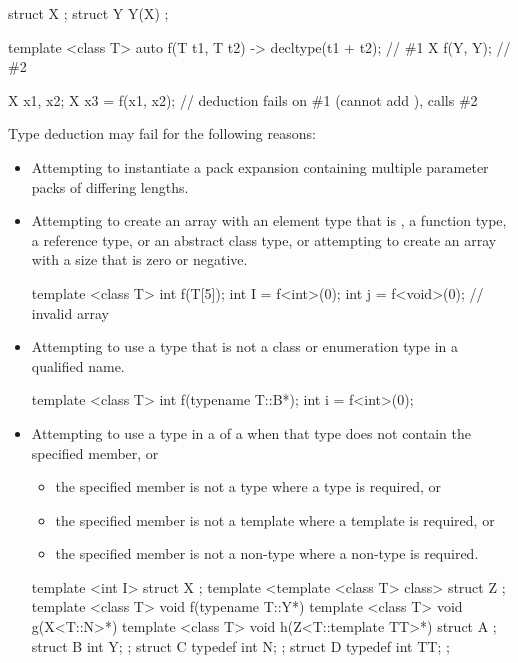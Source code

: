 \enterexample
\begin{codeblock}
struct X { };
struct Y {
  Y(X){}
};

template <class T> auto f(T t1, T t2) -> decltype(t1 + t2); // \#1
X f(Y, Y);  // \#2

X x1, x2;
X x3 = f(x1, x2);  // deduction fails on \#1 (cannot add ), calls \#2\end{codeblock}
\exitexample

\enternote Type deduction may fail for
the following reasons:

\begin{itemize}
\item Attempting to instantiate a pack expansion containing multiple parameter packs of differing lengths.
\item
Attempting to create an array with an element type that is , a
function type, a reference type, or an abstract class type, or attempting
to create an array with a size that is zero or negative.
\enterexample

\begin{codeblock}
template <class T> int f(T[5]);
int I = f<int>(0);
int j = f<void>(0);             // invalid array
\end{codeblock}
\exitexample
\item
Attempting to use a type that is not a class or enumeration type in a qualified name.
\enterexample

\begin{codeblock}
template <class T> int f(typename T::B*);
int i = f<int>(0);
\end{codeblock}
\exitexample
\item
Attempting to use a type in a  of a
 when
that type does not contain the specified member, or
\begin{itemize}
\item
the specified member is not a type where a type is required, or
\item
the specified member is not a template where a template is required, or
\item
the specified member is not a non-type where a non-type is required.
\end{itemize}
\enterexample

\begin{codeblock}
template <int I> struct X { };
template <template <class T> class> struct Z { };
template <class T> void f(typename T::Y*){}
template <class T> void g(X<T::N>*){}
template <class T> void h(Z<T::template TT>*){}
struct A {};
struct B { int Y; };
struct C {
  typedef int N;
};
struct D {
  typedef int TT;
};


\end{codeblock}
\end{itemize}
